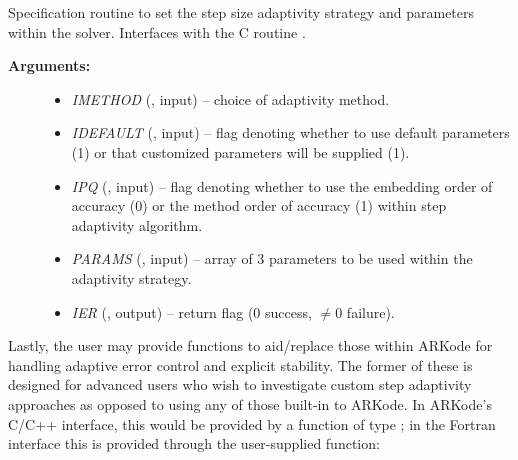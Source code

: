 \documentclass[letterpaper,10pt,english]{sphinxmanual}
\begin{document}
\begin{fulllineitems}
\label{f_interface/Usage:f/_/FARKSETADAPTIVITYMETHOD}
Specification routine to set the step size adaptivity strategy and
parameters within the {\hyperref[f_interface/Usage:f/_/FARKODE]{\emph{}}} solver.  Interfaces with
the C routine {\hyperref[c_interface/User_callable:c.ARKodeSetAdaptivityMethod]{\emph{}}}.
\begin{description}
\item[{\textbf{Arguments:}}] \leavevmode\begin{itemize}
\item {} 
\emph{IMETHOD} (, input) -- choice of adaptivity method.

\item {} 
\emph{IDEFAULT} (, input) -- flag denoting whether to use
default parameters (1) or that customized parameters will be
supplied (1).

\item {} 
\emph{IPQ} (, input) -- flag denoting whether to use
the embedding order of accuracy (0) or the method order of
accuracy (1) within step adaptivity algorithm.

\item {} 
\emph{PARAMS} (, input) -- array of 3 parameters to be
used within the adaptivity strategy.

\item {} 
\emph{IER} (, output) -- return flag (0 success, \(\ne 0\) failure).

\end{itemize}

\end{description}

\end{fulllineitems}


Lastly, the user may provide functions to aid/replace those within
ARKode for handling adaptive error control and explicit stability.
The former of these is designed for advanced users who wish to
investigate custom step adaptivity approaches as opposed to using any
of those built-in to ARKode.  In ARKode's C/C++ interface, this would be
provided by a function of type {\hyperref[c_interface/User_supplied:c.ARKAdaptFn]{\emph{}}}; in the Fortran
interface this is provided through the user-supplied function:
\end{document}
